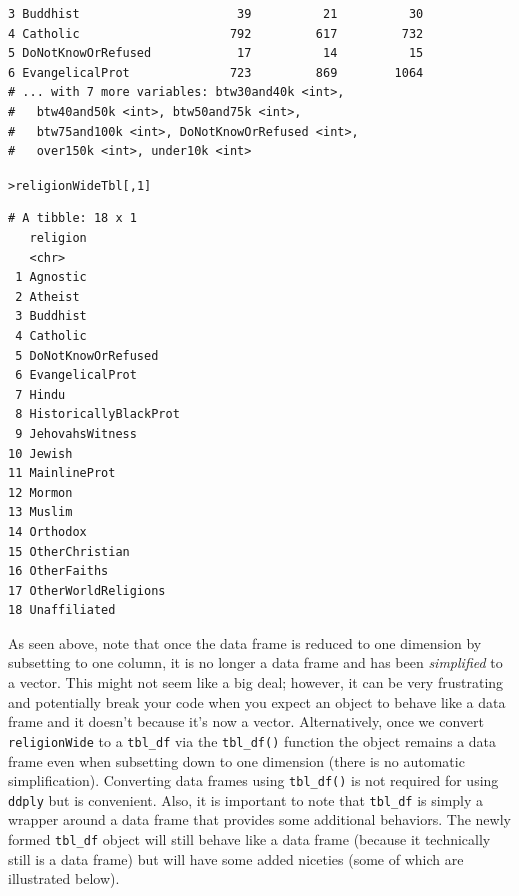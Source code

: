 \documentclass[12pt,oneside]{book}\usepackage[]{graphicx}\usepackage[]{color}
\makeatletter
\newcommand{\hlnum}[1]{\textcolor[rgb]{0.686,0.059,0.569}{#1}}%
\newcommand{\hlstd}[1]{\textcolor[rgb]{0.345,0.345,0.345}{#1}}%
\newenvironment{kframe}{%
 \def\at@end@of@kframe{}%
 \ifinner\ifhmode%
  \def\at@end@of@kframe{\end{minipage}}%
  \begin{minipage}{\columnwidth}%
 \fi\fi%
 \def\FrameCommand##1{\hskip\@totalleftmargin \hskip-\fboxsep
 \colorbox{shadecolor}{##1}\hskip-\fboxsep
     \hskip-\linewidth \hskip-\@totalleftmargin \hskip\columnwidth}%
 \MakeFramed {\advance\hsize-\width
   \@totalleftmargin\z@ \linewidth\hsize
   \@setminipage}}%
 {\par\unskip\endMakeFramed%
 \at@end@of@kframe}
\newenvironment{knitrout}{}{} %
\makeatother
\begin{document}
\begin{knitrout}
\begin{kframe}
\begin{verbatim}
3 Buddhist                      39          21          30
4 Catholic                     792         617         732
5 DoNotKnowOrRefused            17          14          15
6 EvangelicalProt              723         869        1064
# ... with 7 more variables: btw30and40k <int>,
#   btw40and50k <int>, btw50and75k <int>,
#   btw75and100k <int>, DoNotKnowOrRefused <int>,
#   over150k <int>, under10k <int>
\end{verbatim}
\begin{alltt}
\hlstd{> }\hlstd{religionWideTbl[,} \hlnum{1}\hlstd{]}
\end{alltt}
\begin{verbatim}
# A tibble: 18 x 1
   religion             
   <chr>                
 1 Agnostic             
 2 Atheist              
 3 Buddhist             
 4 Catholic             
 5 DoNotKnowOrRefused   
 6 EvangelicalProt      
 7 Hindu                
 8 HistoricallyBlackProt
 9 JehovahsWitness      
10 Jewish               
11 MainlineProt         
12 Mormon               
13 Muslim               
14 Orthodox             
15 OtherChristian       
16 OtherFaiths          
17 OtherWorldReligions  
18 Unaffiliated         
\end{verbatim}
\end{kframe}
\end{knitrout}
As seen above, note that once the data frame is reduced to one dimension by subsetting to one column, it is no longer a data frame and has been \emph{simplified} to a vector. This might not seem like a big deal; however, it can be very frustrating and potentially break your code when you expect an object to behave like a data frame and it doesn't because it's now a vector. Alternatively, once we convert \verb+religionWide+ to a \verb+tbl_df+ via the \verb+tbl_df()+ function the object remains a data frame even when subsetting down to one dimension (there is no automatic simplification). Converting data frames using \verb+tbl_df()+ is not required for using \verb+ddply+ but is convenient. Also, it is important to note that \verb+tbl_df+ is simply a wrapper around a data frame that provides some additional behaviors. The newly formed \verb+tbl_df+ object will still behave like a data frame (because it technically still is a data frame) but will have some added niceties (some of which are illustrated below).
\end{document}
